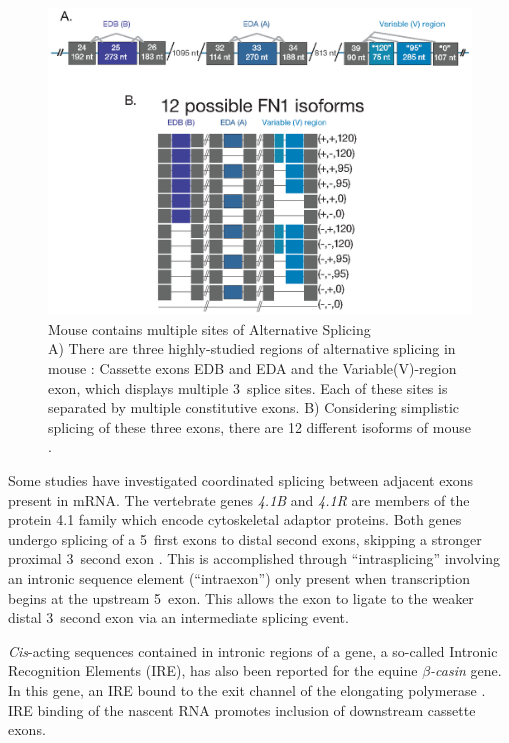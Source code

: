     \begin{figure} %
      \centering 
      \includegraphics{Figures/Intro/Fibronectin.eps}
      \caption[Mouse \fn{} contains multiple sites of Alternative Splicing]
      {
        Mouse \fn{} contains multiple sites of Alternative Splicing\\[0.25cm]
        A) There are three highly-studied regions of alternative splicing in mouse \fn{}: Cassette exons EDB and EDA and the Variable(V)-region exon, which displays multiple 3\textprime~splice sites.  Each of these sites is separated by multiple constitutive exons. B) Considering simplistic splicing of these three exons, there are 12 different isoforms of mouse \fn{}.
        }
      \label{Intro:fig:mouseFn1}
      \end{figure}

    Some studies have investigated coordinated splicing between adjacent exons present in mRNA. The vertebrate genes \textit{4.1B} and \textit{4.1R} are members of the protein 4.1 family which encode cytoskeletal adaptor proteins. Both genes undergo splicing of a 5\textprime~first exons to distal second exons, skipping a stronger proximal 3\textprime~second exon \citep{Parra2008, Parra2012}. This is accomplished through ``intrasplicing'' involving an intronic sequence element (``intraexon'') only present when transcription begins at the upstream 5\textprime~exon. This allows the exon to ligate to the weaker distal 3\textprime~second exon via an intermediate splicing event.

    \textit{Cis}-acting sequences contained in intronic regions of a gene, a so-called Intronic Recognition Elements (IRE), has also been reported for the equine \textit{$\beta$-casin} gene. In this gene, an IRE bound to the exit channel of the elongating polymerase \citep{Lenasi2006}. IRE binding of the nascent RNA promotes inclusion of downstream cassette exons.

